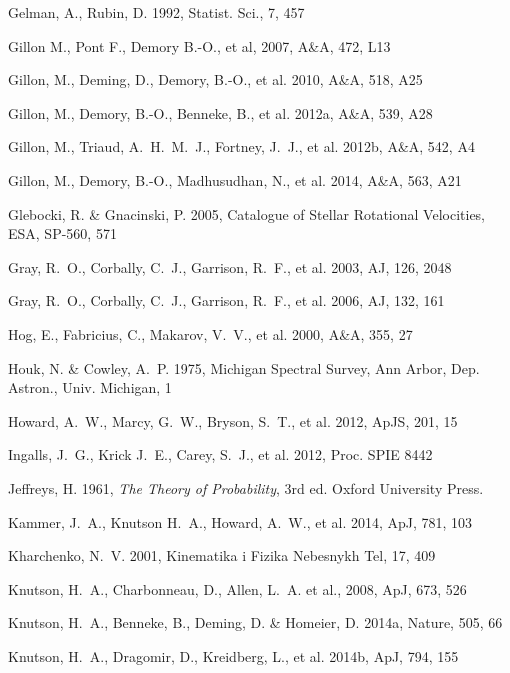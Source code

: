\documentclass[traditabstract]{aa}
\begin{document}
\begin{thebibliography}{}
 Gelman, A., Rubin, D. 1992, Statist. Sci., 7, 457

 Gillon M., Pont F., Demory B.-O., et al, 2007, A\&A, 472, L13

 Gillon, M., Deming, D., Demory, B.-O., et al. 2010, A\&A, 518, A25

 Gillon, M., Demory, B.-O., Benneke, B., et al. 2012a, A\&A, 539, A28
   
 Gillon, M., Triaud, A.~H.~M.~J., Fortney, J.~J., et al. 2012b, A\&A, 542, A4
   
 Gillon, M., Demory, B.-O., Madhusudhan, N., et al. 2014, A\&A, 563, A21
   
 Glebocki, R. \& Gnacinski, P. 2005, Catalogue of Stellar Rotational Velocities, ESA, SP-560, 571

 Gray, R.~O., Corbally, C.~J., Garrison, R.~F., et al. 2003, AJ, 126, 2048
   
 Gray, R.~O., Corbally, C.~J., Garrison, R.~F., et al. 2006, AJ, 132, 161

 Hog, E., Fabricius, C., Makarov, V.~V., et al. 2000, A\&A, 355, 27
   
 Houk, N. \& Cowley, A.~P. 1975, Michigan Spectral Survey, Ann Arbor, Dep. Astron., Univ. Michigan, 1

 Howard, A.~W., Marcy, G.~W., Bryson, S.~T., et al. 2012, ApJS, 201, 15

 Ingalls, J.~G., Krick J.~E., Carey, S.~J., et al. 2012, Proc. SPIE 8442
   
 Jeffreys, H.  1961, {\it The Theory of Probability}, 3rd ed. Oxford University Press.

 Kammer, J.~A., Knutson H.~A., Howard, A.~W., et al. 2014, ApJ, 781, 103
   
 Kharchenko, N.~V. 2001, Kinematika i Fizika Nebesnykh Tel, 17, 409

 Knutson, H.~A., Charbonneau, D., Allen, L.~A. et al., 2008, ApJ, 673, 526

 Knutson, H.~A., Benneke, B., Deming, D. \& Homeier, D. 2014a, Nature, 505, 66
   
 Knutson, H.~A., Dragomir, D., Kreidberg, L., et al. 2014b, ApJ, 794, 155
     

\end{thebibliography}
\end{document}
